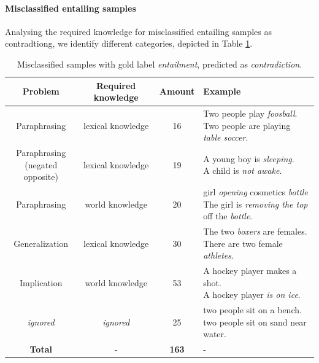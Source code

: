 \paragraph*{Misclassified entailing samples}
Analysing the required knowledge for misclassified entailing samples as contradtiong, we identify different categories, depicted in Table \ref{tab:misclassified_orig_ent}.
\begin{table}[tph!]
\centering
\label{tab:misclassified_orig_ent}
\begin{tabular}{cccl}
\textbf{Problem} & \textbf{Required knowledge} & \textbf{Amount} & \textbf{Example} \\
\toprule
Paraphrasing & lexical knowledge & 16 & \specialcell{Two people play \textit{foosball}.\\Two people are playing \textit{table soccer}.}\\
\specialcellc{Paraphrasing\\(negated opposite)} & lexical knowledge & 19 & \specialcell{A young boy is \textit{sleeping}.\\A child is \textit{not awake}.}\\
Paraphrasing & world knowledge & 20 & \specialcell{girl \textit{opening} cosmetics \textit{bottle}\\The girl is \textit{removing the top} off the \textit{bottle}.}\\
Generalization & lexical knowledge & 30 & \specialcell{The two \textit{boxers} are females.\\There are two female \textit{athletes}.}\\
Implication & world knowledge & 53 & \specialcell{A hockey player makes a shot.\\A hockey player \textit{is on ice}.}\\
\midrule
\textit{ignored} & \textit{ignored} & 25 & \specialcell{two people sit on a bench.\\two people sit on sand near water.} \\
\midrule
\textbf{Total} & - & \textbf{163} & - \\
\bottomrule      
\end{tabular}
\caption{Misclassified samples with gold label \textit{entailment}, predicted as \textit{contradiction}.}
\end{table}
